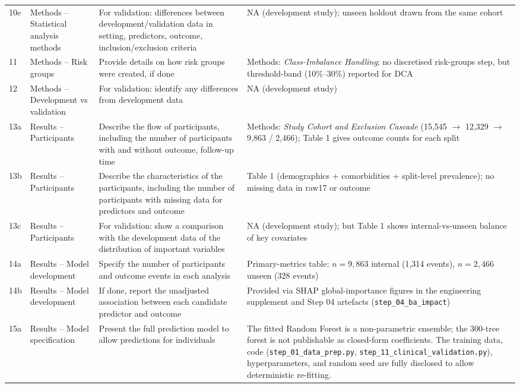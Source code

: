 \documentclass[11pt,a4paper]{article}
\begin{document}
\begin{longtable}{p{0.9cm} p{2.8cm} p{4.6cm} p{6.6cm}}
10e & Methods -- Statistical analysis methods & For validation: differences between development/validation data in setting, predictors, outcome, inclusion/exclusion criteria & NA (development study); unseen holdout drawn from the same cohort \\
11 & Methods -- Risk groups & Provide details on how risk groups were created, if done & Methods: \emph{Class-Imbalance Handling}; no discretised risk-groups step, but threshold-band (10\%--30\%) reported for DCA \\
12 & Methods -- Development vs validation & For validation: identify any differences from development data & NA (development study) \\
13a & Results -- Participants & Describe the flow of participants, including the number of participants with and without outcome, follow-up time & Methods: \emph{Study Cohort and Exclusion Cascade} (15{,}545 $\to$ 12{,}329 $\to$ 9{,}863 / 2{,}466); Table 1 gives outcome counts for each split \\
13b & Results -- Participants & Describe the characteristics of the participants, including the number of participants with missing data for predictors and outcome & Table 1 (demographics + comorbidities + split-level prevalence); no missing data in raw17 or outcome \\
13c & Results -- Participants & For validation: show a comparison with the development data of the distribution of important variables & NA (development study); but Table 1 shows internal-vs-unseen balance of key covariates \\
14a & Results -- Model development & Specify the number of participants and outcome events in each analysis & Primary-metrics table: $n=9{,}863$ internal (1{,}314 events), $n=2{,}466$ unseen (328 events) \\
14b & Results -- Model development & If done, report the unadjusted association between each candidate predictor and outcome & Provided via SHAP global-importance figures in the engineering supplement and Step 04 artefacts (\texttt{step\_04\_ba\_impact}) \\
15a & Results -- Model specification & Present the full prediction model to allow predictions for individuals & The fitted Random Forest is a non-parametric ensemble; the 300-tree forest is not publishable as closed-form coefficients. The training data, code (\texttt{step\_01\_data\_prep.py}, \texttt{step\_11\_clinical\_validation.py}), hyperparameters, and random seed are fully disclosed to allow deterministic re-fitting. \\

\end{longtable}
\end{document}
